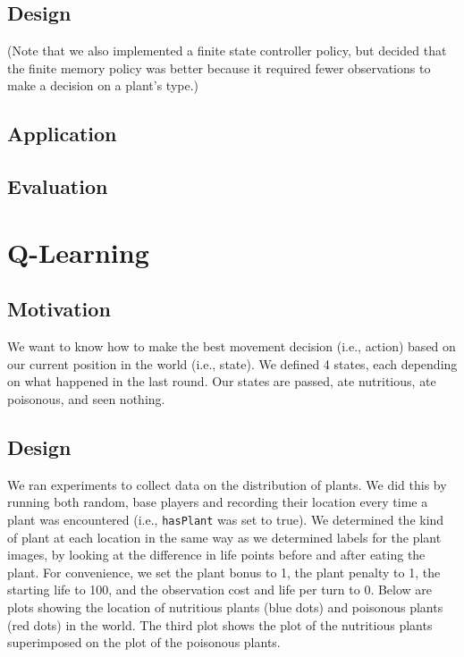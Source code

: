 \documentclass[solution, letterpaper]{cs121}
\begin{document}
\subsection{Design}

(Note that we also implemented a finite state controller policy, but decided that the finite memory policy was better because it required fewer observations to make a decision on a plant's type.)
\subsection{Application}
\subsection{Evaluation}

\section{Q-Learning}
\subsection{Motivation}
We want to know how to make the best movement decision (i.e., action) based on our current position in the world (i.e., state). We defined 4 states, each depending on what happened in the last round. Our states are {\sc passed}, {\sc ate nutritious}, {\sc ate poisonous}, and {\sc seen nothing}.

\subsection{Design}
We ran experiments to collect data on the distribution of plants. We did this by running both random, base players and recording their location every time a plant was encountered (i.e., {\tt hasPlant} was set to true). We determined the kind of plant at each location in the same way as we determined labels for the plant images, by looking at the difference in life points before and after eating the plant. For convenience, we set the plant bonus to 1, the plant penalty to 1, the starting life to 100, and the observation cost and life per turn to 0. Below are plots showing the location of nutritious plants (blue dots) and poisonous plants (red dots) in the world. The third plot shows the plot of the nutritious plants superimposed on the plot of the poisonous plants.
\end{document}
